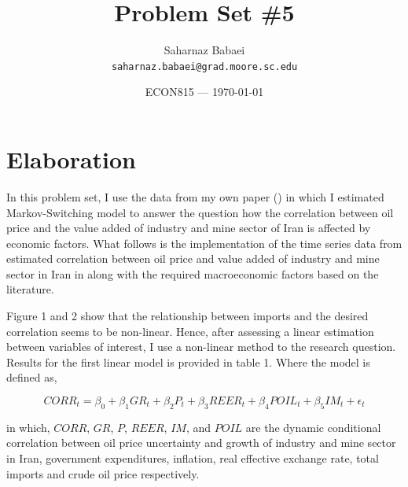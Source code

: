 \documentclass{article}
\title{Problem Set \#5} %
\author{Saharnaz Babaei\\ \texttt{saharnaz.babaei@grad.moore.sc.edu}} %
\date{ECON815 --- \today} %
\begin{document}
\maketitle %


\section*{Elaboration} %

In this problem set, I use the data from my own paper (\cite{heydari2016effects}) in which I estimated Markov-Switching model to answer the question how the correlation between oil price and the value added of industry and mine sector of Iran is affected by economic factors. What follows is the implementation of the time series data from estimated correlation between oil price and value added of industry and mine sector in Iran in \cite{heidari2015different} along with the required macroeconomic factors based on the literature.

Figure 1 and 2 show that the relationship between imports and the desired correlation seems to be non-linear. Hence, after assessing a linear estimation between variables of interest, I use a non-linear method to the research question. Results for the first linear model is provided in table 1. Where the model is defined as,

\begin{equation}
CORR_t = \beta_0 + \beta_1 GR_t + \beta_2 P_t + \beta_3 REER_t + \beta_4 POIL_t + \beta_5 IM_t + \epsilon_t
\end{equation}

in which, $CORR$, $GR$, $P$, $REER$, $IM$, and $POIL$ are the dynamic conditional correlation between oil price uncertainty and growth of industry and mine sector in Iran, government expenditures, inflation, real effective exchange rate, total imports and crude oil price respectively.  
\end{document}
